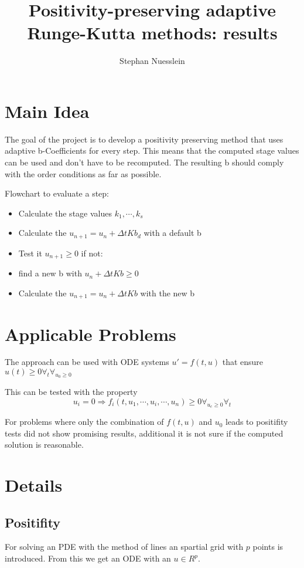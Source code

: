 \documentclass{article}
\title{Positivity-preserving adaptive Runge-Kutta methods: results}
\author{Stephan Nuesslein}
\begin{document}
\maketitle

\section{Main Idea}
The goal of the project is to develop a positivity preserving method that uses adaptive b-Coefficients for every step.  This means that the computed stage values can be used and don't have to be recomputed. 
The resulting b should comply with the order conditions as far as possible.

Flowchart to evaluate a step:

\begin{itemize}
\item Calculate the stage values $k_1,\cdots,k_s$
\item Calculate the $u_{n+1} = u_n + \Delta t K b_{d}$ with a default b
\item Test it $u_{n+1} \geq 0$ if not:
\item find a new b with $u_n + \Delta t K b \geq 0$
\item Calculate the $u_{n+1} = u_n + \Delta t K b$ with the new b
\end{itemize}


\section{Applicable Problems}
The approach can be used with ODE systems $u' = f(t,u)$ that ensure  $u(t) \geq 0 \forall_t \forall_{  u_0 \geq 0}$ 

This can be tested with the property 
\begin{equation}
u_i=0 \Rightarrow f_i(t,u_1,\cdots,u_i,\cdots,u_n) \geq 0  \forall_{u_c \geq 0} \forall_{t}
\end{equation}

For problems where only the combination of $f(t,u)$ and $u_0$ leads to positifity tests did not show promising results, additional it is not sure if the computed solution is reasonable.

\section{Details}

\subsection{Positifity}
For solving an PDE with the method of lines an spartial grid  with $p$ points is introduced. 
From this we get an ODE with an $u \in R^p$.
\end{document}
